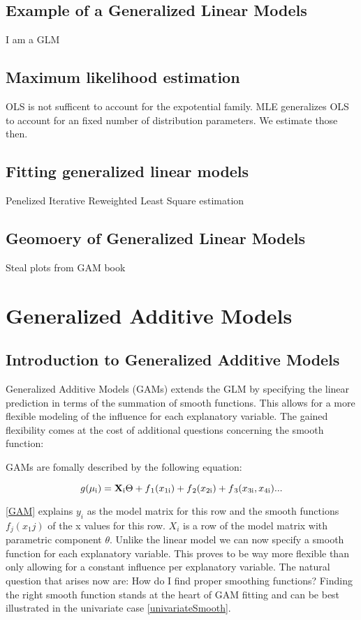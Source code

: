 \documentclass{article}
\begin{document}
    \subsection{Example of a Generalized Linear Models}
    I am a GLM
    \subsection{Maximum likelihood estimation}
    OLS is not sufficent to account for the expotential family. MLE generalizes OLS to account for an fixed number of distribution parameters. We estimate those then.
    \subsection{Fitting generalized linear models}
    Penelized Iterative Reweighted Least Square estimation
    \subsection{Geomoery of Generalized Linear Models}
    Steal plots from GAM book

    \section{Generalized Additive Models}
    \subsection{Introduction to Generalized Additive Models}
    Generalized Additive Models (GAMs) extends the GLM by specifying the linear prediction in terms of the summation of smooth functions. This allows for a more flexible modeling of the influence for each explanatory variable. The gained flexibility comes at the cost of additional questions concerning the smooth function:

    GAMs are fomally described by the following equation:

    \begin{equation} \label{GAM} g(\mu\textsubscript{i}) = \mathbf{X} \textsubscript{i} \Theta + f\textsubscript{1}(x\textsubscript{1i}) + f\textsubscript{2}(x\textsubscript{2i}) + f\textsubscript{3}(x\textsubscript{3i}, x\textsubscript{4i}) ... \end{equation}

    \ref{GAM} explains $y_i$ as the model matrix for this row and the smooth functions $f_j(x_1j)$ of the x values for this row. $X_i$ is a row of the model matrix with parametric component $\theta$. Unlike the linear model we can now  specify a smooth function for each explanatory variable. This proves to be way more flexible than only allowing for a constant influence per explanatory variable. The natural question that arises now are: How do I find proper smoothing functions? Finding the right smooth function stands at the heart of GAM fitting and can be best illustrated in the univariate case \ref{univariateSmooth}.
\end{document}
